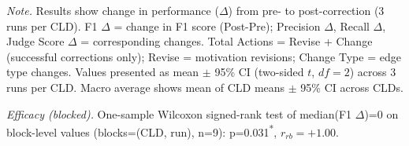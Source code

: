 \begin{table}[H]
\centering
\begin{minipage}{\linewidth}
\centering
\caption{Corrector Performance on Synthetically Corrupted Data (Baseline Prompt)}
\label{tab:rq1b_synthetic_correctness}
\begin{threeparttable}
\end{threeparttable}
\vspace{0.5em}
\footnotesize
\textit{Note.} Results show change in performance ($\Delta$) from pre- to post-correction (3 runs per CLD).
F1 $\Delta$ = change in F1 score (Post-Pre); Precision $\Delta$, Recall $\Delta$, Judge Score $\Delta$ = corresponding changes.
Total Actions = Revise + Change (successful corrections only); Revise = motivation revisions; Change Type = edge type changes.
Values presented as mean $\pm$ 95\% CI (two-sided $t$, $df=2$) across 3 runs per CLD. Macro average shows mean of CLD means $\pm$ 95\% CI across CLDs.\par
\textit{Efficacy (blocked).} One-sample Wilcoxon signed-rank test of median(F1 $\Delta$)=0 on block-level values (blocks=(CLD, run), n=9): p=0.031\textsuperscript{*}, $r_{rb}=+1.00$.

\end{minipage}
\end{table}
